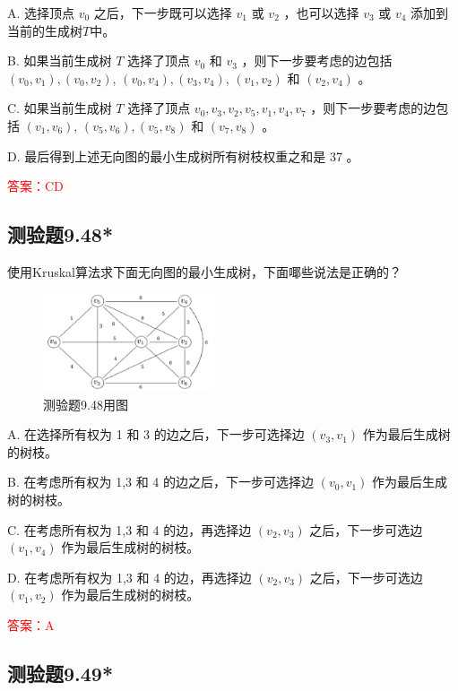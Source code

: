 \documentclass[UTF8, heading=true]{ctexart}
\begin{document}
A. 选择顶点 $v_0$ 之后，下一步既可以选择 $v_1$ 或 $v_2$ ，也可以选择 $v_3$ 或 $v_4$ 添加到当前的生成树$T$中。

B. 如果当前生成树 $T$ 选择了顶点 $v_0$ 和 $v_3$ ，则下一步要考虑的边包括 $\left(v_0, v_1\right),\left(v_0, v_2\right)$, $\left(v_0, v_4\right),\left(v_3, v_4\right)$, $\left(v_1, v_2\right)$ 和 $\left(v_2, v_4\right)$ 。

C. 如果当前生成树 $T$ 选择了顶点 $v_0, v_3, v_2, v_5, v_1, v_4, v_7$ ，则下一步要考虑的边包括 $\left(v_1, v_6\right)$, $\left(v_5, v_6\right),\left(v_5, v_8\right)$ 和 $\left(v_7, v_8\right)$ 。

D. 最后得到上述无向图的最小生成树所有树枝权重之和是 37 。

\textcolor{red}{答案：CD}

\subsection{测验题9.48*}

使用Kruskal算法求下面无向图的最小生成树，下面㖿些说法是正确的？

\begin{figure}[H]
  \centering
  \includegraphics[width=0.45\textwidth]{9.48.jpg} %
  \caption{测验题9.48用图}
\end{figure}

A. 在选择所有权为 1 和 3 的边之后，下一步可选择边 $\left(v_3, v_1\right)$ 作为最后生成树的树枝。

B. 在考虑所有权为 1,3 和 4 的边之后，下一步可选择边 $\left(v_0, v_1\right)$ 作为最后生成树的树枝。

C. 在考虑所有权为 1,3 和 4 的边，再选择边 $\left(v_2, v_3\right)$ 之后，下一步可选边 $\left(v_1, v_4\right)$ 作为最后生成树的树枝。

D. 在考虑所有权为 1,3 和 4 的边，再选择边 $\left(v_2, v_3\right)$ 之后，下一步可选边 $\left(v_1, v_2\right)$ 作为最后生成树的树枝。

\textcolor{red}{答案：A}

\subsection{测验题9.49*}
\end{document}

